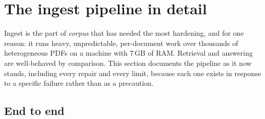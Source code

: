 \section{The ingest pipeline in detail}
\label{sec:ingest-pipeline}

Ingest is the part of \textit{corpus} that has needed the most hardening, and
for one reason: it runs heavy, unpredictable, per-document work over thousands
of heterogeneous PDFs on a machine with 7\,GB of RAM. Retrieval and answering
are well-behaved by comparison. This section documents the pipeline as it now
stands, including every repair and every limit, because each one exists in
response to a specific failure rather than as a precaution.

\subsection{End to end}

